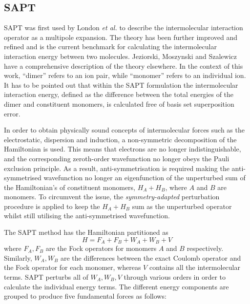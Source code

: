 


\subsection{SAPT}
SAPT was first used by London \emph{et al.}
\cite{Eisenschitz1930a}
to describe the intermolecular interaction operator as a multipole expansion. 
The theory has been further improved and refined and is the current benchmark for calculating the intermolecular interaction energy between two molecules.
Jeziorski, Moszynski and Szalewicz have a comprehensive description of the theory elsewhere. 
\cite{Jeziorski1994a}
In the context of this work, ``dimer'' refers to an ion pair, while ``monomer'' refers to an individual ion.
It has to be pointed out that within the SAPT formulation the intermolecular interaction energy, defined as the difference between the total energies of the dimer and constituent monomers, is calculated free of basis set superposition error. 

In order to obtain physically sound concepts of intermolecular forces such as the electrostatic, dispersion and induction, a non-symmetric decomposition of the Hamiltonian is used.
This means that electrons are no longer indistinguishable, and the corresponding zeroth-order wavefunction no longer obeys the Pauli exclusion principle. 
As a result, anti-symmetrisation is required making the anti-symmetrised wavefunction no longer an eigenfunction of the unperturbed sum of the Hamiltonian's of constituent monomers, $H_A + H_B$, where $A$ and $B$ are monomers.
To circumvent the issue, the \emph{symmetry-adapted} perturbation procedure is applied to keep the $H_A + H_B$ sum as the unperturbed operator whilst still utilising the anti-symmetrised wavefunction.


The SAPT method has the Hamiltonian partitioned as
\begin{equation}
    H = F_A + F_B + W_A + W_B + V
\end{equation}
where $ F_A, F_B $ are the Fock operators for monomers $A$ and $B$ respectively. 
Similarly, $W_A, W_B$ are the differences between the exact Coulomb operator and the Fock operator for each monomer, whereas $V$ contains all the intermolecular terms.
SAPT perturbs all of $W_A, W_B, V$ through various orders in order to calculate the individual energy terms.
The different energy components are grouped to produce five fundamental forces as follows:

